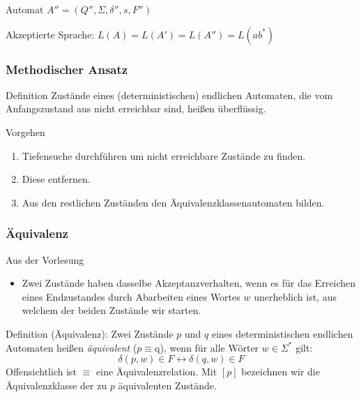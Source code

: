 \documentclass{beamer}
\begin{document}
{\begin{frame}
\begin{block}{Automat \(A'' = (Q'', \Sigma, \delta'', s, F'')\)}
\begin{figure}[H]
\begin{center}
\end{center}
\end{figure}
\end{block}
\begin{block}{}
 Akzeptierte Sprache: \(L(A) = L(A') = L(A'') = L(ab^*) \)
\end{block}
\end{frame}
\begin{frame}
 \frametitle{Methodischer Ansatz}
 \begin{block}{Definition}
  Zustände eines (deterministischen) endlichen Automaten, die vom Anfangszustand aus nicht erreichbar sind, heißen überflüssig.
 \end{block}
\begin{block}{Vorgehen}
 \begin{enumerate}
  \item Tiefensuche durchführen um nicht erreichbare Zustände zu finden.
  \item Diese entfernen.
  \item Aus den restlichen Zuständen den Äquivalenzklassenautomaten bilden.
 \end{enumerate}
\end{block}
\end{frame}
\begin{frame}
 \frametitle{Äquivalenz}
 \vspace{-1cm}
 \begin{block}{Aus der Vorlesung}
  \begin{itemize}
   \item Zwei Zustände haben dasselbe Akzeptanzverhalten, wenn es für das Erreichen eines Endzustandes durch Abarbeiten eines Wortes $w$
   unerheblich ist, aus welchem der beiden Zustände wir starten.
  \end{itemize}
 \end{block}
 \begin{block}{Definition (Äquivalenz):}
  Zwei Zustände $p$ und $q$ eines deterministischen endlichen Automaten heißen \emph{äquivalent} ($p \equiv $q),
  wenn für alle Wörter $w\in\Sigma^*$ gilt:
  \[
   \delta(p, w)\in F \leftrightarrow \delta(q, w)\in F
  \]
  Offensichtlich ist $\equiv$ eine Äquivalenzrelation. Mit $[p]$ bezeichnen wir die Äquivalenzklasse der zu $p$ äquivalenten Zustände.
 \end{block}
\end{frame}
\begin{frame}

\end{frame}}
\end{document}
